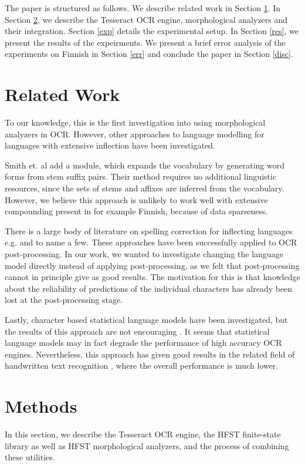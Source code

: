 \documentclass[b5paper]{article}
\begin{document}
The paper is structured as follows. We describe related work in
Section \ref{rel}. In Section \ref{met}, we describe the Tesseract OCR
engine, morphological analyzers and their integration. Section
\ref{exp} details the experimental setup. In Section \ref{res}, we
present the results of the expeirments. We present a brief error
analysis of the experiments on Finnish in Section \ref{err} and
conclude the paper in Section \ref{disc}.

\section{Related Work}
\label{rel}
To our knowledge, this is the first investigation into using
morphological analyzers in OCR. However, other approaches to language
modelling for languages with extensive inflection have been investigated.

Smith et. al \cite{smith09} add a module, which expands the vocabulary
by generating word forms from stem suffix pairs. Their method requires
no additional linguistic resources, since the sets of stems and
affixes are inferred from the vocabulary. However, we believe this
approach is unlikely to work well with extensive compounding present
in for example Finnish, because of data sparseness.

There is a large body of literature on spelling correction for
inflecting languages e.g. \cite{oflazer94} and \cite{pirinen12} to name a
few. These approaches have been successfully applied to OCR
post-processing. In our work, we wanted to investigate changing the
language model directly instead of applying post-processing, as we
felt that post-processing cannot in principle give as good
results. The motivation for this is that knowledge about the
reliability of predictions of the individual characters has already
been lost at the post-processing stage.

Lastly, character based statistical language models have been
investigated, but the results of this approach are not encouraging
\cite{smith11}. It seems that statistical language models may in fact
degrade the performance of high accuracy OCR engines. Nevertheless,
this approach has given good results in the related field of
handwritten text recognition \cite{marti01}, where the overall
performance is much lower.

\section{Methods}
\label{met} In this section, we describe the Tesseract OCR engine, the
HFST finite-state library as well as HFST morphological analyzers, and
the process of combining these utilities.
\end{document}
